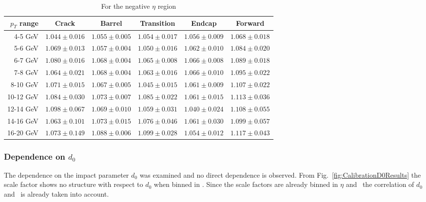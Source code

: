 \begin{table}[bhtp]
\begin{subtable}{\textwidth}
\begin{tabular}{|r|c|c|c|c|c|}
    \hline
    $p_{T}$ range & Crack & Barrel & Transition & Endcap & Forward\\ \hline \hline
    4-5 GeV   & $1.044\pm0.016$ & $1.055\pm0.005$ & $1.054\pm0.017$ & $1.056\pm0.009$ & $1.068\pm0.018$ \\
    5-6 GeV   & $1.069\pm0.013$ & $1.057\pm0.004$ & $1.050\pm0.016$ & $1.062\pm0.010$ & $1.084\pm0.020$ \\
    6-7 GeV   & $1.080\pm0.016$ & $1.068\pm0.004$ & $1.065\pm0.008$ & $1.066\pm0.008$ & $1.089\pm0.018$ \\
    7-8 GeV   & $1.064\pm0.021$ & $1.068\pm0.004$ & $1.063\pm0.016$ & $1.066\pm0.010$ & $1.095\pm0.022$ \\
    8-10 GeV  & $1.071\pm0.015$ & $1.067\pm0.005$ & $1.045\pm0.015$ & $1.061\pm0.009$ & $1.107\pm0.022$ \\
    10-12 GeV & $1.084\pm0.030$ & $1.073\pm0.007$ & $1.085\pm0.022$ & $1.061\pm0.015$ & $1.113\pm0.036$ \\
    12-14 GeV & $1.098\pm0.067$ & $1.069\pm0.010$ & $1.059\pm0.031$ & $1.040\pm0.024$ & $1.108\pm0.055$ \\
    14-16 GeV & $1.063\pm0.101$ & $1.073\pm0.015$ & $1.076\pm0.046$ & $1.061\pm0.030$ & $1.099\pm0.057$ \\
    16-20 GeV & $1.073\pm0.149$ & $1.088\pm0.006$ & $1.099\pm0.028$ & $1.054\pm0.012$ & $1.117\pm0.043$ \\
    \hline
    \end{tabular}
    \caption{For the negative $\eta$ region} \label{tab:Calibration2012SFNeg}
  \end{subtable}
\end{table}

\subsubsection{Dependence on $d_{0}$}

The dependence on the impact parameter $d_{0}$ was examined and no direct dependence is observed. From Fig.~\ref{fig:CalibrationD0Results} the scale factor shows no structure with respect to $d_0$ when binned in \pt. Since the scale factors are already binned in $\eta$ and \pt\ the correlation of $d_0$ and \pt\ is already taken into account.

